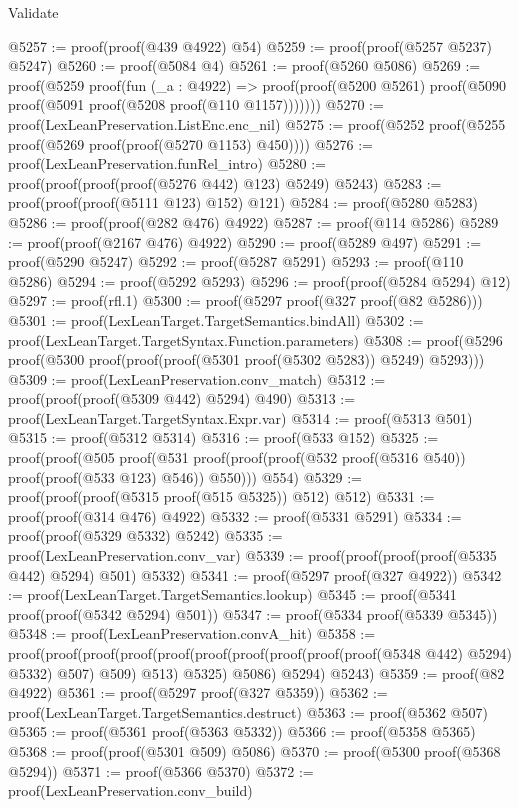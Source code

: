 \begin{lexlean}{Validate}
\begin{coremodule}
@5257 := proof(proof(@439 @4922) @54)
@5259 := proof(proof(@5257 @5237) @5247)
@5260 := proof(@5084 @4)
@5261 := proof(@5260 @5086)
@5269 := proof(@5259
      proof(fun (_a : @4922) =>
        proof(proof(@5200 @5261) proof(@5090 proof(@5091 proof(@5208 proof(@110 @1157)))))))
@5270 := proof(LexLeanPreservation.ListEnc.enc_nil)
@5275 := proof(@5252 proof(@5255 proof(@5269 proof(proof(@5270 @1153) @450))))
@5276 := proof(LexLeanPreservation.funRel_intro)
@5280 := proof(proof(proof(proof(@5276 @442) @123) @5249) @5243)
@5283 := proof(proof(proof(@5111 @123) @152) @121)
@5284 := proof(@5280 @5283)
@5286 := proof(proof(@282 @476) @4922)
@5287 := proof(@114 @5286)
@5289 := proof(proof(@2167 @476) @4922)
@5290 := proof(@5289 @497)
@5291 := proof(@5290 @5247)
@5292 := proof(@5287 @5291)
@5293 := proof(@110 @5286)
@5294 := proof(@5292 @5293)
@5296 := proof(proof(@5284 @5294) @12)
@5297 := proof(rfl.{1})
@5300 := proof(@5297 proof(@327 proof(@82 @5286)))
@5301 := proof(LexLeanTarget.TargetSemantics.bindAll)
@5302 := proof(LexLeanTarget.TargetSyntax.Function.parameters)
@5308 := proof(@5296 proof(@5300 proof(proof(proof(@5301 proof(@5302 @5283)) @5249) @5293)))
@5309 := proof(LexLeanPreservation.conv_match)
@5312 := proof(proof(proof(@5309 @442) @5294) @490)
@5313 := proof(LexLeanTarget.TargetSyntax.Expr.var)
@5314 := proof(@5313 @501)
@5315 := proof(@5312 @5314)
@5316 := proof(@533 @152)
@5325 := proof(proof(@505
        proof(@531 proof(proof(proof(@532 proof(@5316 @540)) proof(proof(@533 @123) @546)) @550)))
      @554)
@5329 := proof(proof(proof(@5315 proof(@515 @5325)) @512) @512)
@5331 := proof(proof(@314 @476) @4922)
@5332 := proof(@5331 @5291)
@5334 := proof(proof(@5329 @5332) @5242)
@5335 := proof(LexLeanPreservation.conv_var)
@5339 := proof(proof(proof(proof(@5335 @442) @5294) @501) @5332)
@5341 := proof(@5297 proof(@327 @4922))
@5342 := proof(LexLeanTarget.TargetSemantics.lookup)
@5345 := proof(@5341 proof(proof(@5342 @5294) @501))
@5347 := proof(@5334 proof(@5339 @5345))
@5348 := proof(LexLeanPreservation.convA_hit)
@5358 := proof(proof(proof(proof(proof(proof(proof(proof(proof(proof(@5348 @442) @5294) @5332) @507)
                @509)
              @513)
            @5325)
          @5086)
        @5294)
      @5243)
@5359 := proof(@82 @4922)
@5361 := proof(@5297 proof(@327 @5359))
@5362 := proof(LexLeanTarget.TargetSemantics.destruct)
@5363 := proof(@5362 @507)
@5365 := proof(@5361 proof(@5363 @5332))
@5366 := proof(@5358 @5365)
@5368 := proof(proof(@5301 @509) @5086)
@5370 := proof(@5300 proof(@5368 @5294))
@5371 := proof(@5366 @5370)
@5372 := proof(LexLeanPreservation.conv_build)

\end{coremodule}
\end{lexlean}

